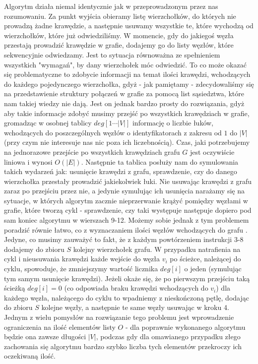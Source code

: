 Algorytm działa niemal identycznie jak w przeprowadzonym przez nas rozumowaniu. Za punkt wyjścia obieramy listę wierzchołków, do których nie prowadzą żadne krawędzie, a następnie usuwamy wszystkie te, które wychodzą od wierzchołków, które już odwiedziliśmy. W momencie, gdy do jakiegoś węzła przestają prowadzić krawędzie w grafie, dodajemy go do listy węzłów, które sekwencyjnie odwiedzamy. Jest to sytuacja równoważna ze spełnieniem wszystkich "wymagań", by dany wierzchołek móc odwiedzić. To co może okazać się problematyczne to zdobycie informacji na temat ilości krawędzi, wchodzących do każdego pojedynczego wierzchołka, gdyż - jak pamiętamy - zdecydowaliśmy się na przedstawienie struktury połączeń w grafie za pomocą list sąsiedztwa, które nam takiej wiedzy nie dają. Jest on jednak bardzo prosty do rozwiązania, gdyż aby takie informacje zdobyć musimy przejść po wszystkich krawędziach w grafie, gromadząc w osobnej tablicy $deg \left[1 \cdots \left| V \right| \right]$ informację o liczbie łuków, wchodzących do poszczególnych węzłów o identyfikatorach z zakresu od $1$ do $\left| V \right|$ (przy czym nie interesuje nas nic poza ich liczebnością). Czas, jaki potrzebujemy na jednorazowe przejście po wszystkich krawędziach grafu $G$ jest oczywiście liniowa i wynosi $O \left( \left| E \right| \right) $. Następnie ta tablica posłuży nam do symulowania takich wydarzeń jak: usunięcie krawędzi z grafu, sprawdzenie, czy do danego wierzchołka przestały prowadzić jakiekolwiek łuki. Nie usuwając krawędzi z grafu zaraz po przejściu przez nie, a jedynie symulując ich usunięcia narażamy się na sytuacje, w których algorytm zacznie nieprzerwanie krążyć pomiędzy węzłami w grafie, które tworzą cykl - sprawdzenie, czy taki występuje następuje dopiero pod sam koniec algorytmu w wierszach 9-12. Możemy sobie jednak z tym problemem poradzić równie łatwo, co z wyznaczaniem ilości węzłów wchodzących do grafu . Jedyne, co musimy zauważyć to fakt, że z każdym powtórzeniem instrukcji 3-8 dodajemy do zbioru $S$ kolejny wierzchołek grafu. W przypadku natrafienia na cykl i nieusuwania krawędzi każde wejście do węzła $v_{i}$ po ścieżce, należącej do cyklu, spowoduje, że zmniejszymy wartość licznika $deg \left[ i \right]$ o jeden (symulując tym samym usunięcie krawędzi). Jeżeli okaże się, że po pierwszym przejściu taką ścieżką $deg \left[ i \right] = 0 $ (co odpowiada braku krawędzi wchodzących do $v_{i}$) dla każdego węzła, należącego do cyklu to wpadniemy z nieskończoną pętlę, dodając do zbioru $S$ kolejne węzły, a następnie te same węzły usuwając w kroku 4. Jednym z wielu pomysłów na rozwiązanie tego problemu jest wprowadzenie ograniczenia na ilość elementów listy $O$ - dla poprawnie wykonanego algorytmu będzie ona zawsze długości $ \left| V \right| $, podczas gdy dla omawianego przypadku złego zachowania się algorytmu bardzo szybko liczba tych elementów przekroczy ich oczekiwaną ilość.


